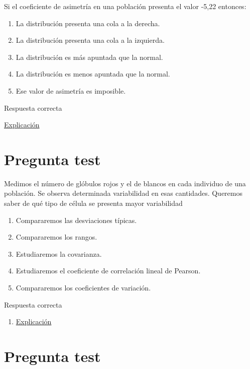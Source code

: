 \documentclass[
]{book}
\providecommand{\tightlist}{%
  \setlength{\itemsep}{0pt}\setlength{\parskip}{0pt}}
\begin{document}
Si el coeficiente de asimetría en una población presenta el valor -5,22 entonces:

\begin{enumerate}
\def\labelenumi{\alph{enumi})}
\tightlist
\item
  La distribución presenta una cola a la derecha.
\item
  La distribución presenta una cola a la izquierda.
\item
  La distribución es más apuntada que la normal.
\item
  La distribución es menos apuntada que la normal.
\item
  Ese valor de asimetría es imposible.
\end{enumerate}

Respuesta correcta

\href{https://1fjmanzano.github.io/bioestadistica/medidas-de-forma.html}{Explicación}

\hypertarget{pregunta-test-78}{%
\section{Pregunta test}\label{pregunta-test-78}}

Medimos el número de glóbulos rojos y el de blancos en cada individuo de una población. Se observa determinada variabilidad en esas cantidades. Queremos saber de qué tipo de célula se presenta mayor variabilidad

\begin{enumerate}
\def\labelenumi{\alph{enumi})}
\tightlist
\item
  Compararemos las desviaciones típicas.
\item
  Compararemos los rangos.
\item
  Estudiaremos la covarianza.
\item
  Estudiaremos el coeficiente de correlación lineal de Pearson.
\item
  Compararemos los coeficientes de variación.
\end{enumerate}

Respuesta correcta

\begin{enumerate}
\def\labelenumi{\alph{enumi})}
\setcounter{enumi}{4}
\tightlist
\item
  \href{https://en.wikipedia.org/wiki/Coefficient_of_variation}{Explicación}
\end{enumerate}

\hypertarget{pregunta-test-79}{%
\section{Pregunta test}\label{pregunta-test-79}}
\end{document}
